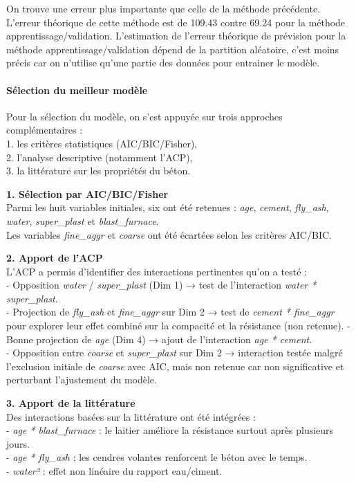 \documentclass[
  12pt,
]{article}
\begin{document}
On trouve une erreur plus importante que celle de la méthode précédente.
L'erreur théorique de cette méthode est de 109.43 contre 69.24 pour la
méthode apprentissage/validation. L'estimation de l'erreur théorique de
prévision pour la méthode apprentissage/validation dépend de la
partition aléatoire, c'est moins précis car on n'utilise qu'une partie
des données pour entrainer le modèle.

\paragraph{Sélection du meilleur
modèle}\label{suxe9lection-du-meilleur-moduxe8le}

Pour la sélection du modèle, on s'est appuyée sur trois approches
complémentaires :\\
1. les critères statistiques (AIC/BIC/Fisher),\\
2. l'analyse descriptive (notamment l'ACP),\\
3. la littérature sur les propriétés du béton.

\textbf{1. Sélection par AIC/BIC/Fisher}\\
Parmi les huit variables initiales, six ont été retenues : \emph{age},
\emph{cement}, \emph{fly\_ash}, \emph{water}, \emph{super\_plast} et
\emph{blast\_furnace}.\\
Les variables \emph{fine\_aggr} et \emph{coarse} ont été écartées selon
les critères AIC/BIC.

\textbf{2. Apport de l'ACP}\\
L'ACP a permis d'identifier des interactions pertinentes qu'on a testé
:\\
- Opposition \emph{water} / \emph{super\_plast} (Dim 1) → test de
l'interaction \emph{water * super\_plast}.\\
- Projection de \emph{fly\_ash} et \emph{fine\_aggr} sur Dim 2 → test de
\emph{cement * fine\_aggr} pour explorer leur effet combiné sur la
compacité et la résistance (non retenue). - Bonne projection de
\emph{age} (Dim 4) → ajout de l'interaction \emph{age * cement}.\\
- Opposition entre \emph{coarse} et \emph{super\_plast} sur Dim 2 →
interaction testée malgré l'exclusion initiale de \emph{coarse} avec
AIC, mais non retenue car non significative et perturbant l'ajustement
du modèle.

\textbf{3. Apport de la littérature}\\
Des interactions basées sur la littérature ont été intégrées :\\
- \emph{age * blast\_furnace} : le laitier améliore la résistance
surtout après plusieurs jours.\\
- \emph{age * fly\_ash} : les cendres volantes renforcent le béton avec
le temps.\\
- \emph{water²} : effet non linéaire du rapport eau/ciment.
\end{document}
